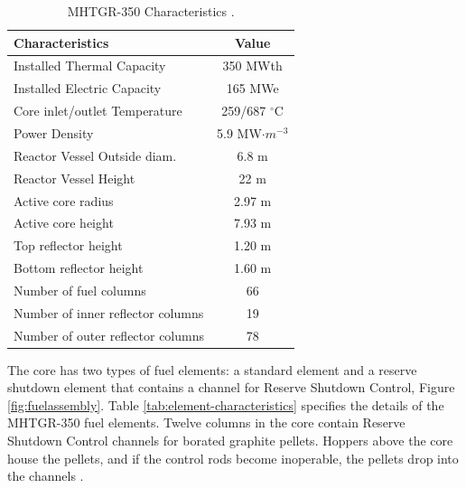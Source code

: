 \begin{table}[htbp!]
  \centering
  \caption{MHTGR-350 Characteristics \cite{oecd_nea_benchmark_2017}.}
  \begin{tabular}{lc}
  \toprule
  Characteristics                   & Value               \\ \midrule
  Installed Thermal Capacity        & 350 MWth            \\
  Installed Electric Capacity       & 165 MWe             \\
  Core inlet/outlet Temperature     & 259/687 $^{\circ}$C    \\
  Power Density                     & 5.9 MW$ \cdot m^{-3}$  \\
  Reactor Vessel Outside diam.      & 6.8 m               \\
  Reactor Vessel Height             & 22 m                \\
  Active core radius                & 2.97 m              \\
  Active core height                & 7.93 m              \\
  Top reflector height              & 1.20 m              \\
  Bottom reflector height           & 1.60 m              \\
  Number of fuel columns            & 66                  \\
  Number of inner reflector columns & 19                  \\
  Number of outer reflector columns & 78                  \\
  \bottomrule
  \end{tabular}
  \label{tab:maincharac}
\end{table}

The core has two types of fuel elements: a standard element and a reserve shutdown element that contains a channel for Reserve Shutdown Control, Figure \ref{fig:fuelassembly}.
Table \ref{tab:element-characteristics} specifies the details of the MHTGR-350 fuel elements.
Twelve columns in the core contain Reserve Shutdown Control channels for borated graphite pellets.
Hoppers above the core house the pellets, and if the control rods become inoperable, the pellets drop into the channels \cite{oecd_nea_benchmark_2017}.

